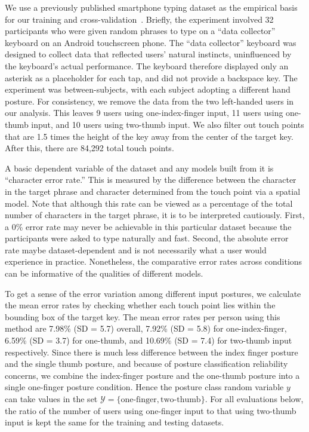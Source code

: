 \documentclass{sigchi}
\begin{document}
We use a previously published smartphone typing dataset as the empirical basis for our training
and cross-validation~\cite{Azenkot:2012}. Briefly, the experiment involved 32
participants who were given random phrases to type on a ``data collector''
keyboard on an Android touchscreen phone.  The ``data collector'' keyboard was designed to collect data that reflected users' natural instincts, uninfluenced by the keyboard's actual performance.  The keyboard therefore displayed only an asterisk as a placeholder for each tap, and did not provide a backspace key.  The experiment was between-subjects, with each subject adopting a different hand posture.  For consistency, we remove the data
from the two left-handed users in our analysis.  This leaves 9 users
using one-index-finger input, 11 users using one-thumb input, and 10 users using
two-thumb input.  We also
filter out touch points that are 1.5 times the height of the key away from
the center of the target key. After this, there are 84,292 total touch points.

A basic dependent variable of the dataset and any models built from it
is ``character error rate.'' This is measured by the difference between the
character in the target phrase and character determined from the touch point via
a spatial model. Note that although this rate can be viewed as a percentage of the
total number of characters in the target phrase, it is to be interpreted cautiously. First, a 0\% error rate may never be achievable in this
particular dataset because the participants were asked to type naturally and
fast. Second, the absolute error rate maybe dataset-dependent and is not
necessarily what a user would experience in practice.  Nonetheless, the comparative error rates across conditions can be informative of the qualities
of different models.

To get a sense of the error variation among different input postures, we
calculate the mean error rates by checking whether each touch point lies within the
bounding box of the target key. The mean error rates per person using this method are
7.98\% (SD = 5.7) overall, 7.92\% (SD = 5.8) for one-index-finger, 6.59\% (SD =
3.7) for one-thumb, and 10.69\% (SD = 7.4) for two-thumb input respectively.
Since there is much less difference between the index finger posture and the single thumb posture, and because of posture classification reliability concerns, we combine the index-finger posture and the one-thumb posture into a single one-finger posture condition. Hence the posture class random variable $y$ can take values in the set $\mathcal{Y} = \{\text{one-finger}, \text{two-thumb}\}$.
For all evaluations below, the ratio of the number of users using one-finger input to
that using two-thumb input is kept the same for the training and testing datasets.
\end{document}

